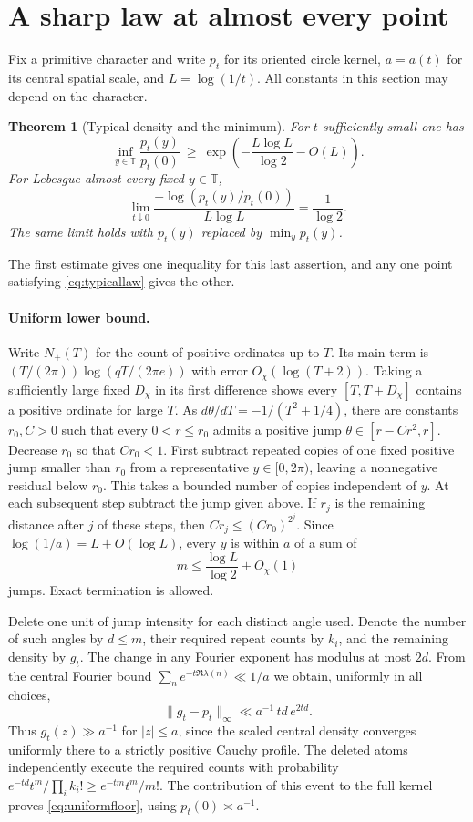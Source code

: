 \documentclass[11pt,letterpaper]{article}
\theoremstyle{plain}
\newtheorem{theorem}{Theorem}[section]\newtheorem{lemma}[theorem]{Lemma}
\theoremstyle{definition}\newtheorem{example}[theorem]{Example}
\begin{document}
\section{A sharp law at almost every point}\label{typical}
Fix a primitive character and write $p_t$ for its oriented circle kernel,
$a=a(t)$ for its central spatial scale, and $L=\log(1/t)$.
All constants in this section may depend on the character.
\begin{theorem}[Typical density and the minimum]\label{sharp-heat}For $t$ sufficiently small one has
\begin{equation}\label{eq:uniformfloor}
 \inf_{y\in\mathbb T}\frac{p_t(y)}{p_t(0)}
 \ \ge\ \exp\!\left(-\frac{L\log L}{\log 2}-O(L)\right).
\end{equation}
For Lebesgue-almost every fixed $y\in\mathbb T$,
\begin{equation}\label{eq:typicallaw}
 \lim_{t\downarrow0}
 \frac{-\log(p_t(y)/p_t(0))}{L\log L}=\frac1{\log 2}.
\end{equation}
The same limit holds with $p_t(y)$ replaced by $\min_y p_t(y)$.\end{theorem}
The first estimate gives one inequality for this last assertion, and any
one point satisfying \eqref{eq:typicallaw} gives the other.

\paragraph{Uniform lower bound.}
Write $N_+(T)$ for the count of positive ordinates up to $T$. Its main
term is $(T/(2\pi))\log(qT/(2\pi e))$ with error $O_\chi(\log(T+2))$.
Taking a sufficiently large fixed $D_\chi$ in its first difference
shows every $[T,T+D_\chi]$ contains a positive ordinate for large $T$.
As $d\theta/dT=-1/(T^2+1/4)$, there are constants $r_0,C>0$ such
that every $0<r\le r_0$ admits a positive jump
$\theta\in[r-Cr^2,r]$. Decrease $r_0$ so that $Cr_0<1$.
First subtract repeated copies of one fixed positive jump smaller than
$r_0$ from a representative $y\in[0,2\pi)$, leaving a nonnegative
residual below $r_0$. This takes a bounded number of copies independent
of $y$. At each subsequent step subtract the jump given above.
If $r_j$ is the remaining distance after $j$ of these steps, then
$Cr_j\le(Cr_0)^{2^j}$. Since $\log(1/a)=L+O(\log L)$,
every $y$ is within $a$ of a sum of
\[
 m\le\frac{\log L}{\log 2}+O_\chi(1)
\]
jumps. Exact termination is allowed.

Delete one unit of jump intensity for each distinct angle used. Denote
the number of such angles by $d\le m$, their required repeat counts by
$k_i$, and the remaining density by $g_t$. The change in any Fourier
exponent has modulus at most $2d$. From the central Fourier bound
$\sum_n e^{-t\Re\lambda(n)}\ll 1/a$ we obtain, uniformly in all
choices,
\[
 \|g_t-p_t\|_\infty\ll a^{-1}\,td\,e^{2td}.
\]
Thus $g_t(z)\gg a^{-1}$ for $|z|\le a$, since the scaled central
density converges uniformly there to a strictly positive Cauchy
profile. The deleted atoms independently execute the required counts
with probability $e^{-td}t^m/\prod_i k_i!\ge e^{-tm}t^m/m!$.
The contribution of this event to the full kernel proves
\eqref{eq:uniformfloor}, using $p_t(0)\asymp a^{-1}$.
\end{document}
